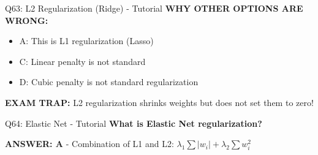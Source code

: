 \documentclass[8pt]{beamer}
\begin{document}
\begin{frame}{Q63: L2 Regularization (Ridge) - Tutorial}
		\vspace{0.05cm}
		\textcolor{myred}{\textbf{WHY OTHER OPTIONS ARE WRONG:}}
		\begin{itemize}
			\item \textcolor{myred}{A:} This is L1 regularization (Lasso)
			\item \textcolor{myred}{C:} Linear penalty is not standard
			\item \textcolor{myred}{D:} Cubic penalty is not standard regularization
		\end{itemize}
		
		\textcolor{myred}{\textbf{EXAM TRAP:}} L2 regularization shrinks weights but does not set them to zero!
	\end{frame}
	
	\begin{frame}{Q64: Elastic Net - Tutorial}
		\fontsize{6.5}{7.5}\selectfont
		\textbf{What is Elastic Net regularization?}
		
		\vspace{0.05cm}
		\textcolor{myblue}{\textbf{ANSWER: A}} - Combination of L1 and L2: $\lambda_1 \sum |w_i| + \lambda_2 \sum w_i^2$
		

\end{frame}
\end{document}
